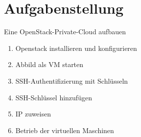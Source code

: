 \section{Aufgabenstellung}
Eine OpenStack-Private-Cloud aufbauen

\begin{enumerate}
	\item Openstack installieren und konfigurieren
	\item Abbild als VM starten 
	\item SSH-Authentifizierung mit Schlüsseln 
	\item SSH-Schlüssel hinzufügen 
	\item IP zuweisen 
	\item Betrieb der virtuellen Maschinen
\end{enumerate}
\clearpage
